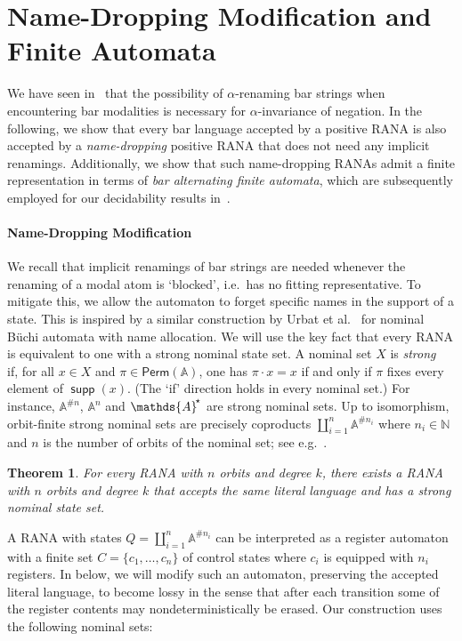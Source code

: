 \documentclass[10pt,a4paper]{amsart}
\newtheorem{theo}{Theorem}[section]
\theoremstyle{definition}
\newcommand{\At}{\mathds{A}}
\newcommand{\Ats}{\At^{\!\raisebox{1pt}{\scriptsize$\star$}}}
\DeclareMathOperator{\supp}{\mathsf{supp}}
\newcommand{\Perm}{\mathsf{Perm}}
\newcommand{\names}{\At}
\newcommand{\Nat}{\mathds{N}}
\renewcommand{\enquote}[1]{`#1'}
\begin{document}
\section{Name-Dropping Modification and Finite Automata}\label{subsec:name-dropping}

We have seen in~ that the possibility
of $\alpha$-renaming bar strings when encountering bar modalities is necessary for
$\alpha$-invariance of negation.
In the following, we show that every bar language accepted by a positive RANA is also
accepted by a \emph{name-dropping} positive RANA that does not need any implicit renamings.
Additionally, we show that such name-dropping RANAs admit a finite representation in terms
of \emph{bar alternating finite automata}, which are subsequently employed for our decidability
results in~.

\paragraph*{Name-Dropping Modification} We recall that implicit renamings of bar strings
are needed whenever the renaming of a modal atom is \enquote{blocked}, i.e.~has no fitting representative.
To mitigate this, we allow the automaton to forget specific names in the support of a state. This is inspired by a similar construction by Urbat et
al.~\cite{uhms21} for nominal Büchi automata with name allocation. We will use the key fact that every RANA is equivalent to one with a strong
nominal state set.
A nominal set $X$ is \emph{strong}~\cite{Tzevelekos07} if, for all $x\in X$
and $\pi\in \Perm(\At)$, one has $\pi\cdot x = x$ if and only if $\pi$
fixes every element of $\supp(x)$.  (The `if' direction holds in every
nominal set.)  For instance, $\At^{\#n}$, $\At^n$ and
$\Ats$ are strong nominal sets.  Up to isomorphism, orbit-finite strong nominal
sets are precisely coproducts $\coprod_{i=1}^n \At^{\# n_i}$
where $n_i\in \Nat$ and $n$ is the number of orbits of
the nominal set; see e.g.~\cite[Cor.~B.27]{mil-urb-19}.

\begin{theo}\label{thm:representation}
  For every RANA with $n$ orbits and degree $k$, there exists a RANA with $n$ orbits and degree $k$
  that accepts the same literal language and has a strong nominal state set.
\end{theo}


A RANA with states $Q = \coprod_{i=1}^n \names^{\# n_i}$ can be interpreted as a register automaton with a finite set $C=\{c_1,\ldots,c_n\}$ of control states where $c_i$ is equipped with $n_i$ registers.
In  below, we will modify such an automaton, preserving the accepted literal language, to become lossy in the sense that after each transition some of the
register contents may nondeterministically be erased. Our construction uses the following nominal sets:
\end{document}
